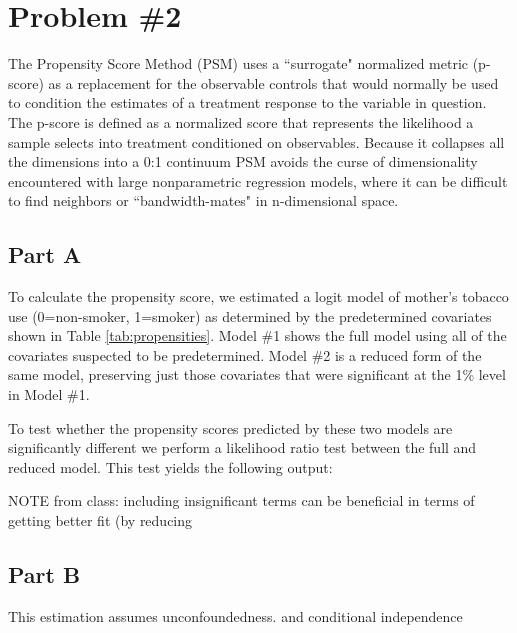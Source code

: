\documentclass[letterpaper, 12pt]{article}
\begin{document}
\section{Problem \#2}

The Propensity Score Method (PSM) uses a ``surrogate" normalized metric (p-score) as a replacement for the observable controls that would normally be used to condition the estimates of a treatment response to the variable in question.  The p-score is defined as a normalized score that represents the likelihood a sample selects into treatment conditioned on observables.  Because it collapses all the dimensions into a 0:1 continuum PSM avoids the curse of dimensionality encountered with large nonparametric regression models, where it can be difficult to find neighbors or ``bandwidth-mates" in n-dimensional space.  

\subsection{Part A}

To calculate the propensity score, we estimated a logit model of mother's tobacco use (0=non-smoker, 1=smoker) as determined by the predetermined covariates shown in Table \ref{tab:propensities}. Model \#1 shows the full model using all of the covariates suspected to be predetermined. Model \#2 is a reduced form of the same model, preserving just those covariates that were significant at the 1\% level in Model \#1. 

\let\clearpage\relax
 

To test whether the propensity scores predicted by these two models are significantly different  we perform a likelihood ratio test between  the full and reduced model. This test yields the following output:

%

NOTE from class: including insignificant terms can be beneficial in terms of getting better fit (by reducing 



\subsection{Part B}

This estimation assumes unconfoundedness. and conditional independence

\end{document}
